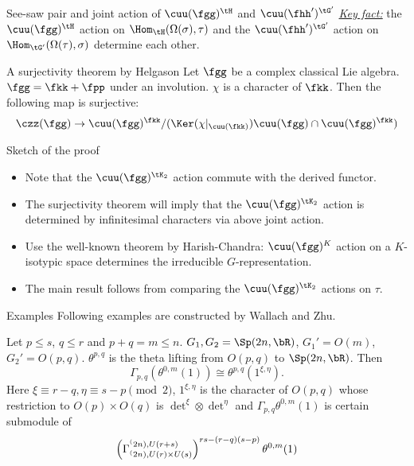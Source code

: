 \documentclass[final,hyperref={pdfpagelabels=false}]{beamer} %
\def\emph#1{{\em \underline{#1}}}
\begin{document}
\begin{frame}
\begin{columns}[t]
\begin{column}{.48\linewidth}
\begin{block}{See-saw pair and  joint action of $\cuu(\fgg)^\tH$ 
and $\cuu(\fhh')^{\tG'}$}
\emph{Key fact:} the $\cuu(\fgg)^\tH$ action on $\Hom_\tH(\Omega(\sigma),\tau)$ and the $\cuu(\fhh')^{\tG'}$  action on $\Hom_{\tG'}(\Omega(\tau),\sigma)$ determine  each other.
\end{block}

\begin{block}{A surjectivity theorem by Helgason}
  Let $\fgg$ be a complex classical Lie algebra.  
  $\fgg = \fkk+\fpp$ under an involution. 
  $\chi$ is a character of $\fkk$.
   Then the following map is surjective:
  \[
  \czz(\fgg) \to \cuu(\fgg)^\fkk/(\Ker(\chi|_{\cuu(\fkk)})\cuu(\fgg)\cap\cuu(\fgg)^\fkk)
  \]
\end{block}

\begin{block}{Sketch of the proof}
  \begin{itemize}
  \item 
  Note that the $\cuu(\fgg)^{\tK_2}$ action commute with the derived functor.
\item 
  The surjectivity theorem will imply that the $\cuu(\fgg)^{\tK_2}$ action is determined by
  infinitesimal characters via above joint action.
\item Use the well-known theorem by Harish-Chandra: $\cuu(\fgg)^{K}$ action on a $K$-isotypic space determines the  irreducible $G$-representation.
\item 
  The main result follows from comparing the $\cuu(\fgg)^{\tK_2}$ actions on $\tau$.
\end{itemize}
% 
\end{block}

\begin{block}{Examples}
      Following examples are constructed by Wallach and Zhu.

      Let $p\leq s$, $q\leq r$ and $p+q=m\leq n$.  
      $G_1,G_2 = \Sp(2n,\bR)$, $G_1' = O(m)$, $G_2'=O(p,q)$.
      $\theta^{p,q}$ is the theta lifting from $O(p,q)$ to
      $\Sp(2n,\bR)$. Then 
      \[
      \displaystyle
      \Gamma_{p,q}(\theta^{0,m}(1)) \cong \theta^{p,q}(1^{\xi,\eta}).\]
      Here $ \xi \equiv r-q, \eta\equiv s-p \pmod{2}$,
      $1^{\xi,\eta}$ is the character of $O(p,q)$
      whose restriction to $O(p)\times O(q)$ is
      $\det^\xi\otimes \det^\eta$ and
      $\Gamma_{p,q}\theta^{0,m}(1)$ is certain submodule of
      \[
      \left(\Gamma_{\sp(2n),U(r)\times U(s)}^{\sp(2n),
          U(r+s)}\right)^{rs-(r-q)(s-p)}\theta^{0,m}(1)
      \]
    \end{block}
 

\end{column}
\end{columns}
\end{frame}
\end{document}
